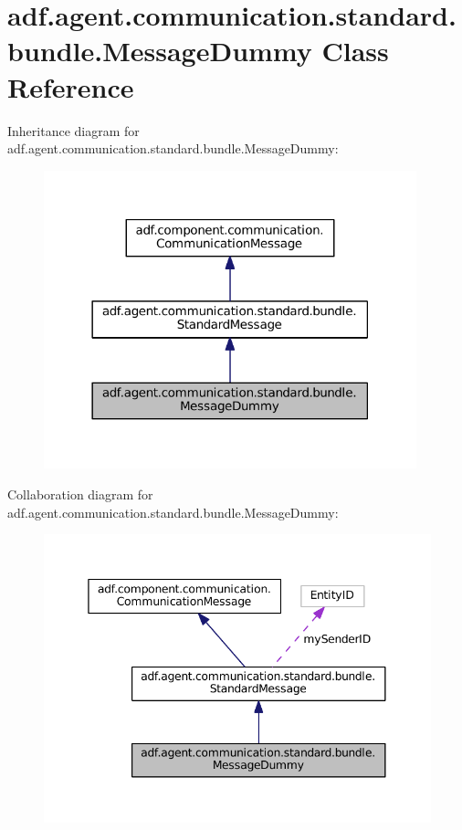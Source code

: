 \hypertarget{classadf_1_1agent_1_1communication_1_1standard_1_1bundle_1_1MessageDummy}{}\section{adf.\+agent.\+communication.\+standard.\+bundle.\+Message\+Dummy Class Reference}
\label{classadf_1_1agent_1_1communication_1_1standard_1_1bundle_1_1MessageDummy}


Inheritance diagram for adf.\+agent.\+communication.\+standard.\+bundle.\+Message\+Dummy\+:
\nopagebreak
\begin{figure}[H]
\begin{center}
\leavevmode
\includegraphics[width=306pt]{classadf_1_1agent_1_1communication_1_1standard_1_1bundle_1_1MessageDummy__inherit__graph}
\end{center}
\end{figure}


Collaboration diagram for adf.\+agent.\+communication.\+standard.\+bundle.\+Message\+Dummy\+:
\nopagebreak
\begin{figure}[H]
\begin{center}
\leavevmode
\includegraphics[width=345pt]{classadf_1_1agent_1_1communication_1_1standard_1_1bundle_1_1MessageDummy__coll__graph}
\end{center}
\end{figure}
